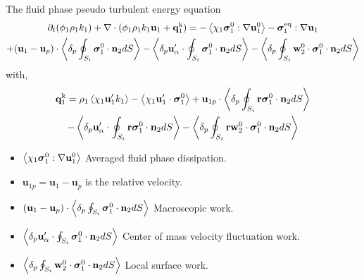 \documentclass{sintefbeamer}
\begin{document}
\begin{frame}
  {The fluid phase pseudo turbulent energy equation}
  \begin{multline*}
    \partial_t (\phi_1\rho_1k_1)  
      + \mathbf{\nabla}\cdot (
          \phi_1\rho_1k_1\textbf{u}_1
          + \textbf{q}_1^\text{k} 
          )
      = 
      - \left<\chi_1\bm{\sigma}_1^0 : \mathbf{\nabla} \textbf{u}_1^0\right>
      - \bm{\sigma}_1^\text{eq} : \mathbf{\nabla} \textbf{u}_1\\
      + (\textbf{u}_1 - \textbf{u}_p)\cdot \left<\delta_p \oint_{S_{i}} {\bm{\sigma}_1^0 \cdot \textbf{n}_2} dS\right> 
      - \left<\delta_p  \textbf{u}_\alpha' \cdot \oint_{S_{i}}   \bm{\sigma}_1^0 \cdot \textbf{n}_2 dS\right>
      - \left<\delta_p  \oint_{S_{i}} \textbf{w}_2^0 \cdot \bm{\sigma}_1^0 \cdot \textbf{n}_2 dS\right> 
  \end{multline*}
with, 
\begin{multline*}
  \textbf{q}_1^\text{k}
    = \rho_1 \left<\chi_1 \textbf{u}_1' k_1\right> 
    - \left<\chi_1 \textbf{u}_1' \cdot \bm{\sigma}_1^0\right>
    + \textbf{u}_{1p}\cdot
    \left<\delta_p \oint_{S_{i}} {\textbf{r}\bm{\sigma}_1^0 \cdot \textbf{n}_2} dS\right>\\
    - \left<\delta_p  \textbf{u}_\alpha' \cdot \oint_{S_{i}}  \textbf{r} \bm{\sigma}_1^0 \cdot \textbf{n}_2 dS\right>
    - \left<\delta_p  \oint_{S_{i}} \textbf{r}\textbf{w}_2^0 \cdot \bm{\sigma}_1^0 \cdot \textbf{n}_2 dS\right>
\end{multline*}

  \begin{itemize}
    \item $\left<\chi_1\bm{\sigma}_1^0 : \mathbf{\nabla} \textbf{u}_1^0\right>$ Averaged fluid phase dissipation. 
    \item $\textbf{u}_{1 p } = \textbf{u}_1 - \textbf{u}_p$ is the relative velocity. 
    \item $(\textbf{u}_1 - \textbf{u}_p)\cdot \left<\delta_p \oint_{S_{i}} {\bm{\sigma}_1^0 \cdot \textbf{n}_2} dS\right> $ Macroscopic work. 
    \item $\left<\delta_p  \textbf{u}_\alpha' \cdot \oint_{S_{i}}   \bm{\sigma}_1^0 \cdot \textbf{n}_2 dS\right>$ Center of mass velocity fluctuation work. 
    \item $\left<\delta_p  \oint_{S_{i}} \textbf{w}_2^0 \cdot \bm{\sigma}_1^0 \cdot \textbf{n}_2 dS\right>$
    Local surface work. 
  \end{itemize}

\end{frame}
\end{document}
